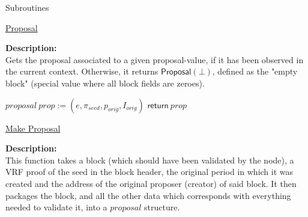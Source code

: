 \documentclass[10pt,a4paper]{article}
\begin{document}
\begin{section}{Subroutines}
\begin{algorithm}[H]
\begin{algorithmic}[1]
    \EndFunction
    \end{algorithmic}
    \caption{\underline{Proposal}}
\end{algorithm}

\noindent \textbf{Description:}\\ Gets the proposal associated to a given proposal-value, 
if it has been observed in the current context.
Otherwise, it returns $\mathsf{Proposal}(\bot)$, defined as the "empty block" (special value where all
block fields are zeroes).

\begin{algorithm}[H]
    \begin{algorithmic}[1]

    \State $proposal \ prop := (e, \pi_{seed}, p_{orig}, I_{orig})$
    \State $\mathsf{return} \ prop$

    \EndFunction
    \end{algorithmic}
    \caption{\underline{Make Proposal}}
\end{algorithm}


\noindent \textbf{Description:}\\ This function takes a block (which should have been validated by the node),
a VRF proof of the seed in the block header, the original period in which it was created and the address of the
original proposer (creator) of said block. It then packages the block, and all the other data which corresponds
with everything needed to validate it, into a $proposal$ structure.

\begin{algorithm}[H]\label{proposal-value}
    \begin{algorithmic}[1]


\end{algorithmic}
\end{algorithm}
\end{section}
\end{document}
